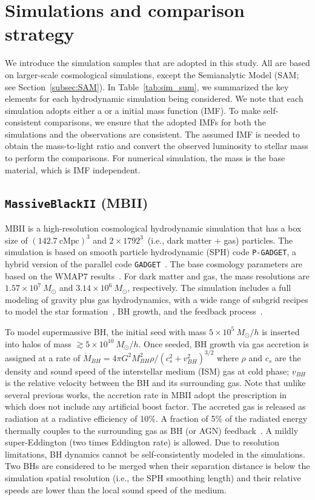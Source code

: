 \documentclass[twocolumn]{aastex631}
\begin{document}
\section{Simulations and comparison strategy}
\label{sec:simulations}
We introduce the simulation samples that are adopted in this study. All are based on larger-scale cosmological simulations, except the Semianalytic Model (SAM; see Section~\ref{subsec:SAM}). In Table~\ref{tab:sim_sum}, we summarized the key elements for each hydrodynamic simulation being considered. We note that each simulation adopts either a  \cite{2003PASP..115..763C} or a \cite{1955ApJ...121..161S} initial mass function (IMF). To make self-consistent comparisons, we ensure that the adopted IMFs for both the simulations and the observations are consistent. The assumed IMF is needed to obtain the mass-to-light ratio and convert the observed luminosity to stellar mass to perform the comparisons. For numerical simulation, the mass is the base material, which is IMF independent.


\subsection{{\tt MassiveBlackII} (MBII)}\label{subsec:MBII}
MBII is a high-resolution cosmological hydrodynamic simulation that has a box size of $(142.7~\mathrm{cMpc})^3$
and $2\times1792^3$~(i.e., dark matter + gas) particles. 
The simulation is based on smooth particle hydrodynamic (SPH) code \texttt{P-GADGET}, a hybrid version of the parallel code {\tt GADGET}~\citep{2005MNRAS.364.1105S}. The base cosmology parameters are based on the WMAP7 results~\citep{2011ApJS..192...18K}. For dark matter and gas, the mass resolutions are $1.57\times 10^7~M_{\odot}$ and $3.14\times 10^6~M_{\odot}$, respectively. The simulation includes a full modeling of gravity plus gas hydrodynamics, with a wide range of subgrid recipes to model the star formation~\citep{2003MNRAS.339..289S}, BH growth, and the feedback process~\citep{2005Natur.433..604D}. 

To model supermassive BH, the initial seed with mass $5\times 10^{5}~M_{\odot}/h$ is inserted into halos of mass $\gtrsim 5\times 10^{10}~M_{\odot}/h$. Once seeded, BH growth via gas accretion is assigned at a rate of $\dot{M}_{BH}={4\pi G^2 M_{BH}^2 \rho}/{(c_s^2+v_{BH}^2)^{3/2}}$ where $\rho$ and $c_s$ are the density and sound speed of the interstellar medium (ISM) gas at cold phase; $v_{BH}$ is the relative velocity between the BH and its surrounding gas. Note that unlike several previous works, the accretion rate in MBII adopt the prescription in~\citet{Pelupessy2007} which does not include any artificial boost factor. The accreted gas is released as radiation at a radiative efficiency of 10\%. A fraction of 5\% of the radiated energy thermally couples to the surrounding gas as BH (or AGN) feedback~\citep{2005Natur.433..604D}. A mildly super-Eddington (two times Eddington rate) is allowed. Due to resolution limitations, BH dynamics cannot be self-consistently modeled in the simulations. Two BHs are considered to be merged when their separation distance is below the simulation spatial resolution (i.e., the SPH smoothing length) and their relative speeds are lower than the local sound speed of the medium.
\end{document}
